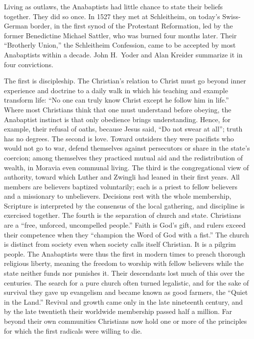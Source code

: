 Living as outlaws, the Anabaptists had little chance to state their beliefs together. They did so
once. In 1527 they met at Schleitheim, on today's Swiss-German border, in the first synod of the
Protestant Reformation, led by the former Benedictine Michael Sattler, who was burned four months
later. Their ``Brotherly Union,'' the Schleitheim Confession, came to be accepted by most Anabaptists
within a decade. John H.~Yoder and Alan Kreider summarize it in four convictions.

The first is discipleship. The Christian's relation to Christ must go beyond inner experience and
doctrine to a daily walk in which his teaching and example transform life: ``No one can truly know
Christ except he follow him in life.'' Where most Christians think that one must understand before
obeying, the Anabaptist instinct is that only obedience brings understanding. Hence, for example,
their refusal of oaths, because Jesus said, ``Do not swear at all''; truth has no degrees. The second
is love. Toward outsiders they were pacifists who would not go to war, defend themselves against
persecutors or share in the state's coercion; among themselves they practiced mutual aid and the
redistribution of wealth, in Moravia even communal living. The third is the congregational view of
authority, toward which Luther and Zwingli had leaned in their first years. All members are believers
baptized voluntarily; each is a priest to fellow believers and a missionary to unbelievers. Decisions
rest with the whole membership, Scripture is interpreted by the consensus of the local gathering,
and discipline is exercised together. The fourth is the separation of church and state. Christians
are a ``free, unforced, uncompelled people.'' Faith is God's gift, and rulers exceed their competence
when they ``champion the Word of God with a fist.'' The church is distinct from society even when
society calls itself Christian. It is a pilgrim people. The Anabaptists were thus the first in modern
times to preach thorough religious liberty, meaning the freedom to worship with fellow believers while the state neither funds nor punishes it. Their descendants lost much of this over the centuries. The search for a pure church often turned
legalistic, and for the sake of survival they gave up evangelism and became known as good farmers,
the ``Quiet in the Land.'' Revival and growth came only in the late nineteenth century, and by the
late twentieth their worldwide membership passed half a million. Far beyond their own communities
Christians now hold one or more of the principles for which the first radicals were willing to die.

